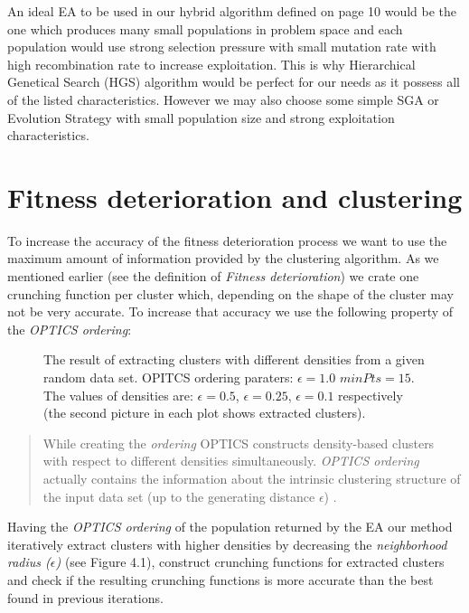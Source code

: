 An ideal EA to be used in our hybrid algorithm defined on page 10
would be the one which produces many small populations in problem space and
each population would use strong selection pressure with small mutation rate
with high recombination rate to increase exploitation. This is why Hierarchical 
Genetical Search (HGS) algorithm would be perfect for our needs as it possess
all of the listed characteristics. However we may also choose some simple 
SGA or Evolution Strategy with small population size and strong exploitation
characteristics.
 

\section{Fitness deterioration and clustering}

To increase the accuracy of the fitness deterioration process 
we want to use the maximum amount of information provided by the clustering
algorithm. As we mentioned earlier (see the definition of \textit{Fitness
deterioration}) we crate one crunching function per cluster which, depending
on the shape of the cluster may not be very accurate. To increase that accuracy
we use the following property of the \textit{OPTICS ordering}:

\begin{figure}
  \centering
  \caption{The result of extracting clusters with different densities from a
  given random data set. OPITCS ordering paraters: $\epsilon=1.0$ $minPts=15$.
  The values of densities are: $\epsilon=0.5$, $\epsilon=0.25$, $\epsilon=0.1$
  respectively (the second picture in each plot shows extracted clusters).}
  \label{clusters}
\end{figure}

\begin{quotation}
While creating the \textit{ordering} OPTICS constructs density-based clusters
with respect to different densities simultaneously. \textit{OPTICS ordering}
actually contains the information about the intrinsic clustering structure of
the input data set (up to the generating distance $\epsilon$) \cite{optics}.
\end{quotation}

Having the \textit{OPTICS ordering} of the population returned by the EA our
method iteratively extract clusters with higher densities by decreasing 
the \textit{neighborhood radius ($\epsilon$)} (see Figure 4.1), construct
crunching functions for extracted clusters and check if the resulting crunching functions 
is more accurate than the best found in previous iterations. 

